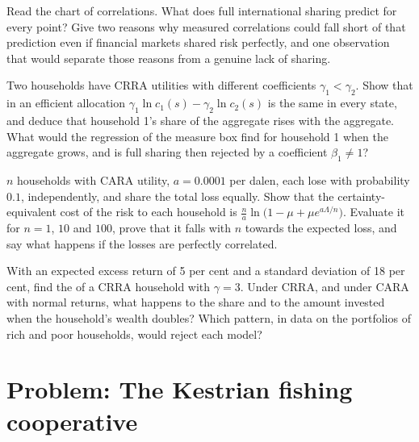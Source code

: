 \begin{exercise}[$\star\star$]\label{exo:b2:insurance-and-risk-sharing:9}
Read the chart of correlations. What does full international sharing predict for every point? Give
two reasons why measured correlations could fall short of that prediction even if financial markets
shared risk perfectly, and one observation that would separate those reasons from a genuine lack of
sharing.
\end{exercise}

\begin{exercise}[$\star\star\star$]\label{exo:b2:insurance-and-risk-sharing:10}
Two households have CRRA utilities with different coefficients $\gamma_1 < \gamma_2$. Show that in an
efficient allocation $\gamma_1\ln c_1(s) - \gamma_2\ln c_2(s)$ is the same in every state, and deduce
that household 1's share of the aggregate rises with the aggregate. What would the regression of the
measure box find for household 1 when the aggregate grows, and is full sharing then rejected by a
coefficient $\beta_1 \neq 1$?
\end{exercise}

\begin{exercise}[$\star\star\star$]\label{exo:b2:insurance-and-risk-sharing:11}
$n$ households with CARA utility, $a = \num{0.0001}$ per dalen, each lose  with probability
$0.1$, independently, and share the total loss equally. Show that the certainty-equivalent cost of the
risk to each household is $\frac{n}{a}\ln\bigl(1 - \mu + \mu e^{a\Lambda/n}\bigr)$. Evaluate it for $n
= 1$, $10$ and $100$, prove that it falls with $n$ towards the expected loss, and say what happens if
the losses are perfectly correlated.
\end{exercise}

\begin{exercise}[$\star\star\star$]\label{exo:b2:insurance-and-risk-sharing:12}
With an expected excess return of 5 per cent and a standard deviation of 18 per cent, find the
 of a CRRA household with $\gamma = 3$. Under CRRA, and under CARA with normal returns,
what happens to the share and to the amount invested when the household's wealth doubles? Which
pattern, in data on the portfolios of rich and poor households, would reject each model?
\end{exercise}

\section{Problem: The Kestrian fishing cooperative}\label{sec:b2:insurance-and-risk-sharing:problem}

